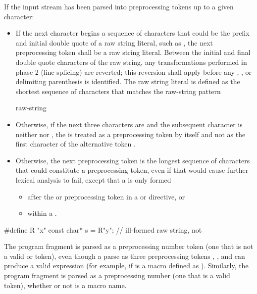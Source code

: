 \pnum
If the input stream has been parsed into preprocessing tokens up to a
given character:
\begin{itemize}
\item
{}%
If the next character begins a sequence of characters that could be the prefix
and initial double quote of a raw string literal, such as , the next preprocessing
token shall be a raw string literal. Between the initial and final
double quote characters of the raw string, any transformations performed in phase
2 (line splicing) are reverted; this reversion
shall apply before any , , or delimiting
parenthesis is identified. The raw string literal is defined as the shortest sequence
of characters that matches the raw-string pattern
\begin{ncbnf}
  raw-string
\end{ncbnf}

\item Otherwise, if the next three characters are \tcode{<::} and the subsequent character
is neither \tcode{:} nor \tcode{>}, the \tcode{<} is treated as a preprocessing token by
itself and not as the first character of the alternative token \tcode{<:}.

\item Otherwise,
the next preprocessing token is the longest sequence of
characters that could constitute a preprocessing token, even if that
would cause further lexical analysis to fail,
except that a  is only formed
\begin{itemize}
\item
after the  or  preprocessing token in a
 or
 directive, or

\item
within a .

\end{itemize}
\end{itemize}

\pnum
\begin{example}
\begin{codeblock}
#define R "x"
const char* s = R"y";           // ill-formed raw string, not 
\end{codeblock}
\end{example}

\pnum
\begin{example}
The program fragment  is parsed as a
preprocessing number token (one that is not a valid
 or  token),
even though a parse as three preprocessing tokens
, \tcode{+}, and  can produce a valid expression (for example,
if  is a macro defined as ). Similarly, the
program fragment  is parsed as a preprocessing number (one
that is a valid  token),
whether or not  is a macro name.
\end{example}

